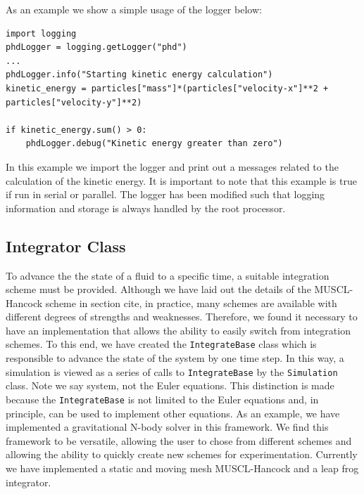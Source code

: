As an example we show a simple usage of the logger below:
\begin{lstlisting}
import logging
phdLogger = logging.getLogger("phd")
...
phdLogger.info("Starting kinetic energy calculation")
kinetic_energy = particles["mass"]*(particles["velocity-x"]**2 + particles["velocity-y"]**2)

if kinetic_energy.sum() > 0:
	phdLogger.debug("Kinetic energy greater than zero")
\end{lstlisting}
In this example we import the logger and print out a messages related to the calculation of the
kinetic energy. It is important to note that this example is true if run in serial or parallel. The logger
has been modified such that logging information and storage is always handled by the root processor.

\subsection{Integrator Class}
\label{sec.integrator}
To advance the the state of a fluid to a specific time, a suitable integration
scheme must be provided. Although we have laid out the details of the MUSCL-Hancock scheme
in section cite, in practice, many schemes are available with different degrees of 
strengths and weaknesses. Therefore, we found it necessary to have an implementation
that allows the ability to easily switch from integration schemes. To this end, we have
created the \lstinline{IntegrateBase} class which is responsible to advance the state
of the system by one time step. In this way, a simulation is viewed as a series of calls
to \lstinline{IntegrateBase} by the \lstinline{Simulation} class.
Note we say system, not the Euler equations. This
distinction is made because the \lstinline{IntegrateBase} is not limited to the Euler
equations and, in principle, can be used to implement other equations. As an example,
we have implemented a gravitational N-body solver in this framework. We find
this framework to be versatile, allowing the user to chose from different schemes
and allowing the ability to quickly create new schemes for experimentation.
Currently we have implemented a static and moving mesh MUSCL-Hancock and a leap
frog integrator.

